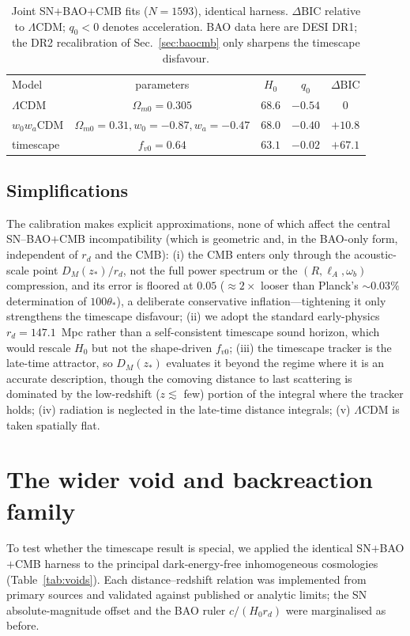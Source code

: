 \documentclass[aps,prd,twocolumn,nofootinbib,superscriptaddress,floatfix]{revtex4-2}
\newcommand{\Ho}{H_{0}}
\newcommand{\fvo}{f_{v0}}
\newcommand{\Lcdm}{\Lambda\mathrm{CDM}}
\newcommand{\dBIC}{\Delta\mathrm{BIC}}
\begin{document}
\begin{table}[t]
\caption{Joint SN$+$BAO$+$CMB fits ($N=1593$), identical harness. $\dBIC$
relative to $\Lcdm$; $q_0<0$ denotes acceleration. BAO data here are DESI DR1;
the DR2 recalibration of Sec.~\ref{sec:baocmb} only sharpens the timescape
disfavour.}
\label{tab:joint}
\begin{ruledtabular}
\begin{tabular}{lcccc}
Model & parameters & $\Ho$ & $q_0$ & $\dBIC$\\
\colrule
$\Lcdm$ & $\Omega_{m0}=0.305$ & $68.6$ & $-0.54$ & $0$\\
$w_0w_a$CDM & $\Omega_{m0}=0.31,w_0=-0.87,w_a=-0.47$ & $68.0$ & $-0.40$ & $+10.8$\\
timescape & $\fvo=0.64$ & $63.1$ & $-0.02$ & $+67.1$\\
\end{tabular}
\end{ruledtabular}
\end{table}

\subsection{Simplifications}
\label{sec:simpl}
The calibration makes explicit approximations, none of which affect the central
SN--BAO$+$CMB incompatibility (which is geometric and, in the BAO-only form,
independent of $r_d$ and the CMB): (i) the CMB enters only through the
acoustic-scale point $D_M(z_*)/r_d$, not the full power spectrum or the
$(R,\ell_A,\omega_b)$ compression, and its error is floored at $0.05$
($\approx2\times$ looser than Planck's $\sim\!0.03\%$ determination of $100\theta_*$),
a deliberate conservative inflation---tightening it only strengthens the timescape
disfavour; (ii) we adopt the standard early-physics
$r_d=147.1$~Mpc rather than a self-consistent timescape sound horizon, which
would rescale $\Ho$ but not the shape-driven $\fvo$; (iii) the timescape tracker
is the late-time attractor, so $D_M(z_*)$ evaluates it beyond the regime where it is an
accurate description, though the comoving distance to last scattering is dominated by the
low-redshift ($z\lesssim$ few) portion of the integral where the tracker holds;
(iv) radiation is neglected in the late-time distance integrals; (v) $\Lcdm$ is
taken spatially flat.

\section{The wider void and backreaction family}
\label{sec:voids}
To test whether the timescape result is special, we applied the identical
SN$+$BAO$+$CMB harness to the principal dark-energy-free inhomogeneous
cosmologies (Table~\ref{tab:voids}). Each distance--redshift relation was
implemented from primary sources and validated against published or analytic
limits; the SN absolute-magnitude offset and the BAO ruler $c/(\Ho r_d)$ were
marginalised as before.
\end{document}
